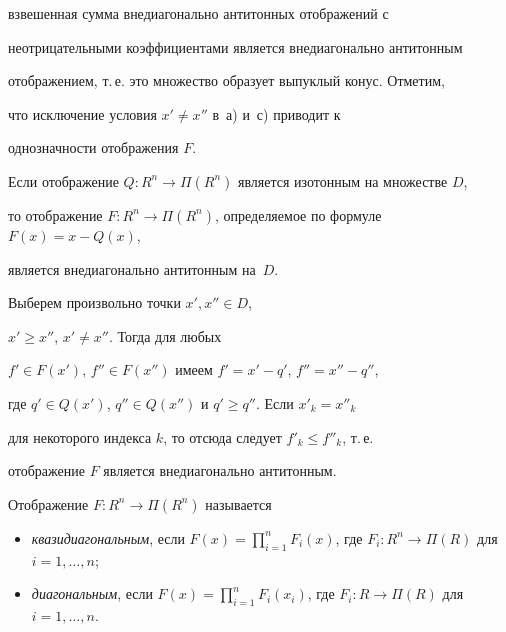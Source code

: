 взвешенная сумма внедиагонально антитонных отображений  с


неотрицательными коэффициентами является внедиагонально антитонным


отображением, т.\,е. это множество образует выпуклый конус. Отметим,


что исключение условия $x'\neq x''$ в~а) и~с) приводит к


однозначности отображения $F$.











\begin{props}\label{pr:1}


Если отображение $Q:R^n \to \Pi(R^n)$ является изотонным на множестве $D$,


то отображение $F:R^n \to \Pi(R^n)$, определяемое по формуле $F(x)=x-Q(x)$,


является внедиагонально антитонным на~$D$.


\end{props}








\begin{pf}


Выберем произвольно точки $x', x'' \in D$,


$x'\ge x''$, $x'\neq x''$. Тогда для любых


$f' \in F(x')$, $f'' \in F(x'')$ имеем $f'=x'-q'$, $f''=x''-q''$,


где $q' \in Q(x')$, $q'' \in Q(x'')$ и $q' \ge q''$. Если $x'_k = x''_k$


для некоторого индекса $k$, то отсюда следует $f'_k \le f''_k$, т.\,е.


отображение $F$ является внедиагонально антитонным.


\end{pf}








\begin{defns} \label{def:2}


Отображение $F: R^n \to \Pi (R^n)$ называется


\begin{itemize}


\item[a)] {\it квазидиагональным}, если $F(x) = \prod \limits_{i=1}^{n}


F_i (x)$, где $F_i : R^n \to \Pi(R)$ для $i=1,\dotsc,n$;


\item[b)] {\it диагональным}, если $F(x) = \prod \limits_{i=1}^{n}


F_i(x_i)$, где $F_i:R \to \Pi(R)$ для $i=1,\dotsc,n$.


\end{itemize}


\end{defns}





